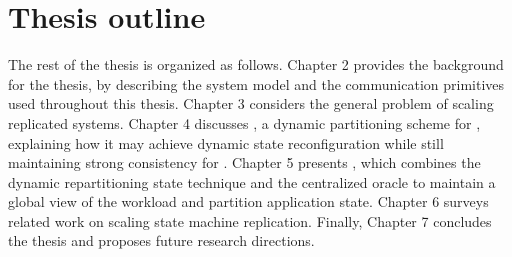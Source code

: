 \section{Thesis outline}
\label{sec:structure}

The rest of the thesis is organized as follows. Chapter 2 provides the
background for the thesis, by describing the system model and the communication
primitives used throughout this thesis. Chapter 3 considers the general problem
of scaling replicated systems. Chapter 4 discusses \dssmr, a dynamic
partitioning scheme for \smr, explaining how it may achieve dynamic state
reconfiguration while still maintaining strong consistency for \smr. Chapter 5
presents \dynastar, which combines the dynamic repartitioning state technique
and the centralized oracle to maintain a global view of the workload and partition
application state. Chapter 6 surveys related work on scaling state machine
replication. Finally, Chapter 7 concludes the thesis and proposes future
research directions.
